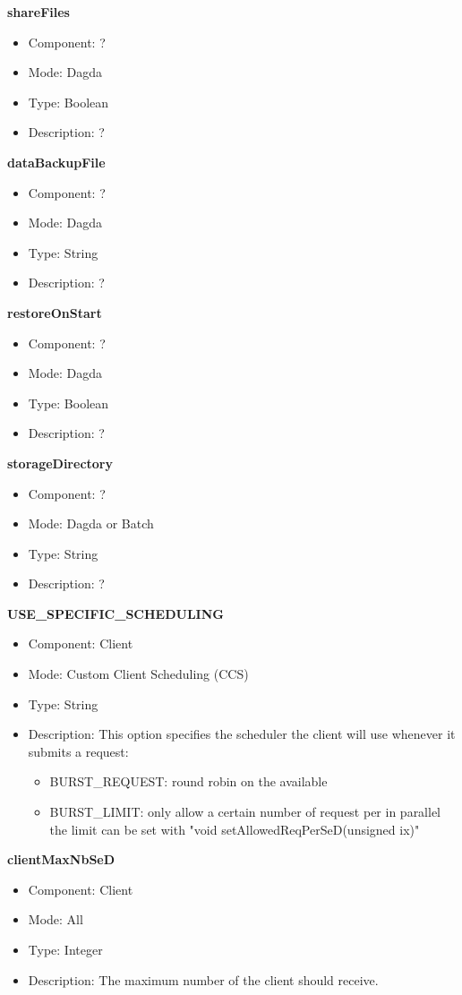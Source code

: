 \begin{description}
\item{\bf{shareFiles}}
  \begin{itemize}
  \item Component: ?
  \item Mode: Dagda
  \item Type: Boolean
  \item Description: ?
  \end{itemize}

\item{\bf{dataBackupFile}}
  \begin{itemize}
  \item Component: ?
  \item Mode: Dagda
  \item Type: String
  \item Description: ? 
  \end{itemize}

\item{\bf{restoreOnStart}}
  \begin{itemize}
  \item Component: ?
  \item Mode: Dagda
  \item Type: Boolean
  \item Description: ?
  \end{itemize}

\item{\bf{storageDirectory}}
  \begin{itemize}
  \item Component: ?
  \item Mode: Dagda or Batch
  \item Type: String
  \item Description: ? 
  \end{itemize}

\item{\bf{USE\_SPECIFIC\_SCHEDULING}}
  \begin{itemize}
  \item Component: Client
  \item Mode: Custom Client Scheduling (CCS)
  \item Type: String
  \item Description: 
    This option specifies the scheduler the client will use whenever it submits
    a request:
    \begin{itemize}
    \item BURST\_REQUEST: round robin on the available \sed
    \item BURST\_LIMIT: only allow a certain number of request per \sed in
      parallel the limit can be set with "void
      setAllowedReqPerSeD(unsigned ix)"
    \end{itemize}
  \end{itemize}

\item{\bf{clientMaxNbSeD}}
  \begin{itemize}
  \item Component: Client
  \item Mode: All
  \item Type: Integer
  \item Description: The maximum number of \sed the client should receive.
  \end{itemize}

\end{description}
